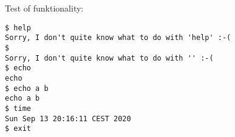 \inputminted{csharp}{\context/answer/Shell.cs}

Test of funktionality:
\begin{verbatim}
$ help
Sorry, I don't quite know what to do with 'help' :-(
$ 
Sorry, I don't quite know what to do with '' :-(
$ echo
echo
$ echo a b 
echo a b 
$ time
Sun Sep 13 20:16:11 CEST 2020
$ exit
\end{verbatim}
